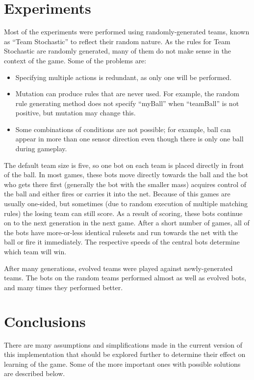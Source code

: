 \documentclass[%
        compressed,
        notitlepage,
        narroweqnarray,
        inline,
        ]{ieee}
\begin{document}
\section{Experiments}

Most of the experiments were performed using randomly-generated teams, known
as ``Team Stochastic'' to reflect their random nature. As the rules for Team
Stochastic are randomly generated, many of them do not make sense in the
context of the game. \nopagebreak Some of the problems are:
\begin{itemize}
\item Specifying multiple actions is redundant, as only one
will be performed.
\item Mutation can produce rules that are never used. For example, the
random rule generating method does not specify ``myBall'' when ``teamBall''
is not positive, but mutation may change this.
\item Some combinations of conditions are not possible; for example, ball
can appear in more than one sensor direction even though there is only one
ball during gameplay.
\end{itemize}

The default team size is five, so one bot on each team is placed directly
in front of the ball. In most games, these bots move directly towards
the ball and the bot who gets there first (generally the bot with the
smaller mass) acquires control of the ball and either fires or carries it
into the net. Because of this games are usually one-sided, but sometimes
(due to random execution of multiple matching rules) the losing team can
still score. As a result of scoring, these bots continue on to the next
generation in the next game. After a short number of games, all of the bots
have more-or-less identical rulesets and run towards the net with the
ball or fire it immediately. The respective speeds of the central bots determine
which team will win.

After many generations, evolved teams were played against newly-generated
teams. The bots on the random teams performed almost as well as evolved
bots, and many times they performed better.

\section{Conclusions}

There are many assumptions and simplifications made in the current version
of this implementation that should be explored further to determine their
effect on learning of the game. Some of the more important ones with
possible solutions are described below.
\end{document}
